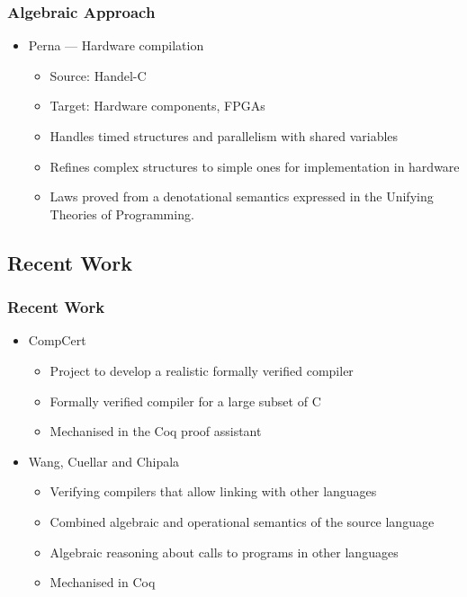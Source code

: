 \documentclass{beamer}
\newcommand{\footmake}[1]{
\ifthenelse{\equal{#1}{}}%
	{}%
	{\footnotetext{#1}}%
}
\newenvironment{slide}[2][fragile,environment=slide]
{\begin{frame}[#1]
	\frametitle{#2}\begin{refsegment}}
{\footmake{\printbibliography[segment=\therefsegment]}\end{refsegment}\end{frame}}
\begin{document}
\begin{slide}{Algebraic Approach}
  \begin{itemize}
  \item Perna\cite{perna2010, perna2011} --- Hardware compilation
    \begin{itemize}
    \item Source: Handel-C
    \item Target: Hardware components, FPGAs
    \item Handles timed structures and parallelism with shared variables
    \item Refines complex structures to simple ones for implementation in hardware
    \item Laws proved from a denotational semantics expressed in the Unifying Theories of Programming\cite{hoare1998}.
    \end{itemize}
  \end{itemize}
\end{slide}

\subsection{Recent Work}

\begin{slide}{Recent Work}
  \begin{itemize}
  \item CompCert\cite{leroy2012}
    \begin{itemize}
    \item Project to develop a realistic formally verified compiler
    \item Formally verified compiler for a large subset of C
    \item Mechanised in the Coq proof assistant
    \end{itemize}
  \item Wang, Cuellar and Chipala\cite{wang2014}
    \begin{itemize}
    \item Verifying compilers that allow linking with other languages
    \item Combined algebraic and operational semantics of the source language
    \item Algebraic reasoning about calls to programs in other languages
    \item Mechanised in Coq 
    \end{itemize}
  \end{itemize}
\end{slide}
\end{document}
